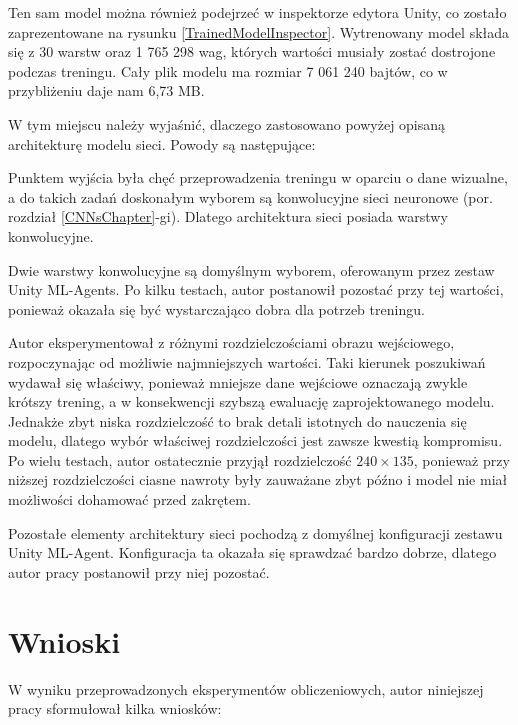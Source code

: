 Ten sam model można również podejrzeć w inspektorze edytora Unity, co zostało zaprezentowane na rysunku \ref{TrainedModelInspector}. Wytrenowany model składa się z 30 warstw oraz 1 765 298 wag, których wartości musiały zostać dostrojone podczas treningu. Cały plik modelu ma rozmiar 7 061 240 bajtów, co w przybliżeniu daje nam 6,73 MB.

W tym miejscu należy wyjaśnić, dlaczego zastosowano powyżej opisaną architekturę modelu sieci. Powody są następujące:
\begin{enumerate*}
\item Punktem wyjścia była chęć przeprowadzenia treningu w oparciu o dane wizualne, a do takich zadań doskonałym wyborem są konwolucyjne sieci neuronowe (por. rozdział \ref{CNNsChapter}-gi). Dlatego architektura sieci posiada warstwy konwolucyjne.
\item Dwie warstwy konwolucyjne są domyślnym wyborem, oferowanym przez zestaw Unity ML-Agents. Po  kilku testach, autor postanowił pozostać przy tej wartości, ponieważ okazała się być wystarczająco dobra dla potrzeb treningu.
\item Autor eksperymentował z różnymi rozdzielczościami obrazu wejściowego, rozpoczynając od możliwie najmniejszych wartości. Taki kierunek poszukiwań wydawał się właściwy, ponieważ mniejsze dane wejściowe oznaczają zwykle krótszy trening, a w konsekwencji szybszą ewaluację zaprojektowanego modelu. Jednakże zbyt niska rozdzielczość to brak detali istotnych do nauczenia się modelu, dlatego wybór właściwej rozdzielczości jest zawsze kwestią kompromisu. Po wielu testach, autor ostatecznie przyjął rozdzielczość $240 \times 135$, ponieważ przy niższej rozdzielczości ciasne nawroty były zauważane zbyt późno i model nie miał możliwości dohamować przed zakrętem.
\item Pozostałe elementy architektury sieci pochodzą z domyślnej konfiguracji zestawu Unity ML-Agent. Konfiguracja ta okazała się sprawdzać bardzo dobrze, dlatego autor pracy postanowił przy niej pozostać.
\end{enumerate*}

\section{Wnioski}
W wyniku przeprowadzonych eksperymentów obliczeniowych, autor niniejszej pracy sformułował kilka wniosków:

